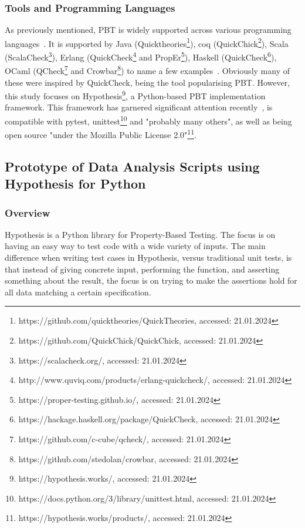 \documentclass[runningheads]{llncs}
\begin{document}
\subsubsection{Tools and Programming Languages}
As previously mentioned, PBT is widely supported across various programming languages~\cite{Chen2022,Shi2023}. It is supported by Java (Quicktheories\footnote{https://github.com/quicktheories/QuickTheories, accessed: 21.01.2024}), coq (QuickChick\footnote{https://github.com/QuickChick/QuickChick, accessed: 21.01.2024}), Scala (ScalaCheck\footnote{https://scalacheck.org/, accessed: 21.01.2024}), Erlang (QuickCheck\footnote{http://www.quviq.com/products/erlang-quickcheck/, accessed: 21.01.2024} and PropEr\footnote{https://proper-testing.github.io/, accessed: 21.01.2024}), Haskell (QuickCheck\footnote{https://hackage.haskell.org/package/QuickCheck, accessed: 21.01.2024}), OCaml (QCheck\footnote{https://github.com/c-cube/qcheck/, accessed: 21.01.2024} and Crowbar\footnote{https://github.com/stedolan/crowbar, accessed: 21.01.2024}) to name a few examples~\cite{MacIver2016,Padhye2019,Paraskevopoulou2015,Arts2008,Papadakis2011,Claessen2000}. Obviously many of these were inspired by QuickCheck, being the tool popularising PBT. However, this study focuses on Hypothesis\footnote{https://hypothesis.works/, accessed: 21.01.2024}, a Python-based PBT implementation framework. This framework has garnered significant attention recently~\cite{Corgozinho2023,MacIver2019}, is compatible with pytest, unittest\footnote{https://docs.python.org/3/library/unittest.html, accessed: 21.01.2024} and "probably many others", as well as being open source "under the Mozilla Public License 2.0"\footnote{https://hypothesis.works/products/, accessed: 21.01.2024}.

\subsection{Prototype of Data Analysis Scripts using Hypothesis for Python}
\subsubsection{Overview}
Hypothesis is a Python library for Property-Based Testing. The focus is on having an easy way to test code with a wide variety of inputs. The main difference when writing test cases in Hypothesis, versus traditional unit tests, is that instead of giving concrete input, performing the function, and asserting something about the result, the focus is on trying to make the assertions hold for all data matching a certain specification.
\end{document}
